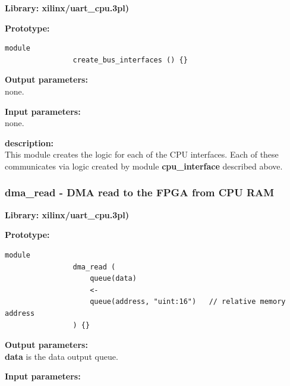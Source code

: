             {\bf Library: xilinx/uart\_cpu.3pl)}

            {\bf Prototype:} \\
            \vsp
            \begin{lstlisting}[gobble=12, language=threepl]
                module
                create_bus_interfaces () {}
            \end{lstlisting}
            
            {\bf Output parameters:} \\
            
                none.                       
            
            {\bf Input parameters:} \\
            
                none.
                       
            {\bf description:} \\
            This module creates the logic for each of the CPU interfaces. Each
            of these communicates via logic created by module {\bf cpu\_interface}
            described above.







        \subsubsection{dma\_read - DMA read to the FPGA from CPU RAM}\label{sec:lmuartcpudmar}

            {\bf Library: xilinx/uart\_cpu.3pl)}

            {\bf Prototype:} \\
            \vsp
            \begin{lstlisting}[gobble=12, language=threepl]
                module
                dma_read (
                    queue(data)
                    <-
                    queue(address, "uint:16")   // relative memory address
                ) {}
            \end{lstlisting}
            
            {\bf Output parameters:} \\
            
                {\bf data} is the data output queue.                       
            
            {\bf Input parameters:} \\
            
